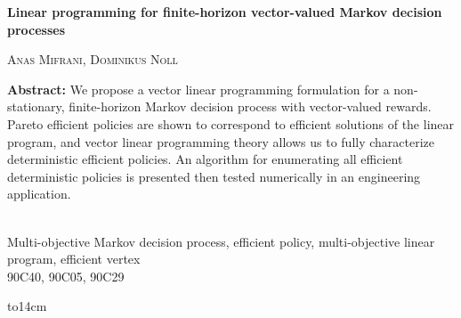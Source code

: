 \documentclass{article}
\theoremstyle{definition}
\numberwithin{equation}{section}
\begin{document}
\makeatletter



\begin{center}%
\large{\bf Linear programming for finite-horizon vector-valued Markov decision processes}
\end{center}\vspace{5mm}
\begin{center}



\textsc{Anas Mifrani, Dominikus Noll}\end{center}


\vspace{2mm}


\footnotesize{
\noindent\begin{minipage}{14cm}
{\bf Abstract:}
We propose a vector linear programming formulation for a non-stationary, finite-horizon Markov decision process
with vector-valued rewards. Pareto efficient policies are shown to correspond to
efficient solutions of the linear program, and vector linear programming theory allows us
to fully characterize deterministic efficient policies. 
An algorithm for enumerating all efficient deterministic policies is presented then tested numerically in an engineering application.
\end{minipage}
 \\[5mm]

 {Multi-objective Markov decision process, efficient policy, multi-objective linear program, efficient vertex}\\
 {90C40, 90C05, 90C29}


\hbox to14cm{\hrulefill}\par







}
\end{document}
